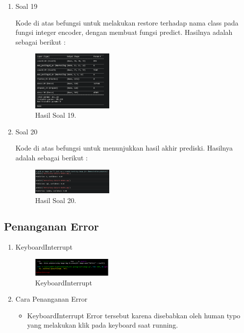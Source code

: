 \begin{enumerate}
	\item Soal 19
	\hfill\break
	
	Kode di atas befungsi untuk melakukan restore terhadap nama class pada fungsi integer encoder, dengan membuat fungsi predict. Hasilnya adalah sebagai berikut :  
	\begin{figure}[H]
	\centering
		\includegraphics[width=4cm]{figures/1174005/tugas7/materi/hasil19.PNG}
		\caption{Hasil Soal 19.}
	\end{figure}

	\item Soal 20
	\hfill\break
	
	Kode di atas befungsi untuk menunjukkan hasil akhir prediski. Hasilnya adalah sebagai berikut :  
	\begin{figure}[H]
	\centering
		\includegraphics[width=4cm]{figures/1174005/tugas7/materi/hasil20.PNG}
		\caption{Hasil Soal 20.}
	\end{figure}
\end{enumerate}

\subsection{Penanganan Error}
\begin{enumerate}
	\item KeyboardInterrupt
	\begin{figure}[H]
		\includegraphics[width=4cm]{figures/1174005/tugas7/error/1.PNG}
		\centering
		\caption{KeyboardInterrupt}
	\end{figure}

	\item Cara Penanganan Error
	\begin{itemize}
		\item KeyboardInterrupt
		\hfill\break
		Error tersebut karena disebabkan oleh human typo yang melakukan klik pada keyboard saat running.
	\end{itemize}
\end{enumerate}


